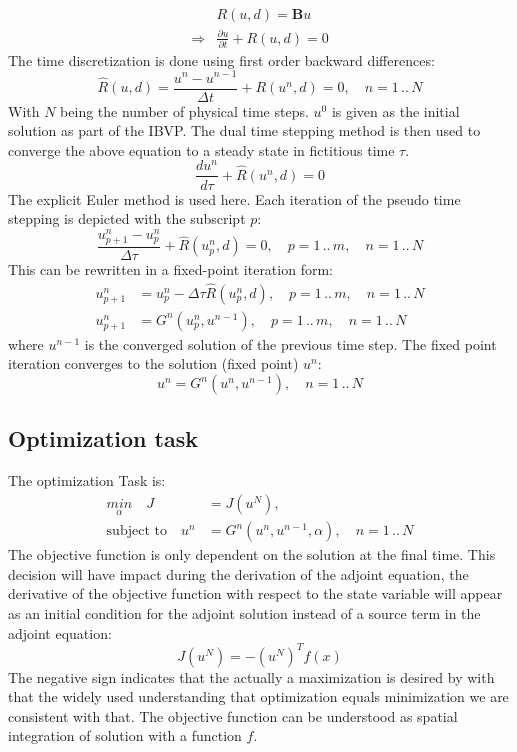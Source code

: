 \documentclass[10pt]{article}
\begin{document}
\begin{align}
&R(u,d) = \mathbf{B}u  \\
\Rightarrow & \frac{\partial u}{\partial t} + R(u,d) = 0
\end{align}
The time discretization is done using first order backward differences:
\begin{equation}
\hat R (u,d) = \frac{u^{n} - u^{n-1}}{\Delta t} + R(u^n,d) = 0,\quad n= 1\,..\,N
\end{equation}
With $N$ being the number of physical time steps. $u^0$ is given as the initial solution as part of the IBVP. The dual time stepping method is then used to converge the above equation to a steady state in fictitious time $\tau$. 
\begin{equation}
\frac{d u^n}{d\tau} + \hat R(u^{n},d) = 0
\end{equation} 
The explicit Euler method is used here. Each iteration of the pseudo time stepping is depicted with the subscript $p$:
\begin{equation}
\frac{u^n_{p+1}-u^n_{p}}{\Delta\tau} + \hat R(u^{n}_{p},d) = 0,\quad p= 1\,..\,m,\quad n= 1\,..\,N
\end{equation} 
This can be rewritten in a fixed-point iteration form:
\begin{align}
u^n_{p+1} &= u^n_{p} - \Delta\tau\hat R(u^{n}_{p},d),\quad p= 1\,..\,m,\quad n= 1\,..\,N\\
u^n_{p+1} &= G^n \left( u^n_p, u^{n-1} \right),\quad p= 1\,..\,m,\quad n= 1\,..\,N
\end{align}
where $u^{n-1}$ is the converged solution of the previous time step. The fixed point iteration converges to the solution (fixed point) $u^n$:
\begin{equation}
u^n = G^n\left( u^n, u^{n-1} \right),\quad n= 1\,..\,N
\end{equation}
\subsection{Optimization task}
The optimization Task is:
\begin{align}
\underset{\alpha}{min}\quad J &= J(u^N), \\
\text{subject to}\quad u^n &= G^n \left( u^n, u^{n-1}, \alpha \right),\quad n= 1\,..\,N
\end{align}
The objective function is only dependent on the solution at the final time. This decision will have impact during the derivation of the adjoint equation, the derivative of the objective function with respect to the state variable will appear as an initial condition for the adjoint solution instead of a source term in the adjoint equation:
\begin{equation}
J(u^N) = -(u^N)^T f(x)
\end{equation}
The negative sign indicates that the actually a maximization is desired by with that the widely used understanding that optimization equals minimization we are consistent with that. 
The objective function can be understood as spatial integration of solution with a function $f$.
\end{document}
